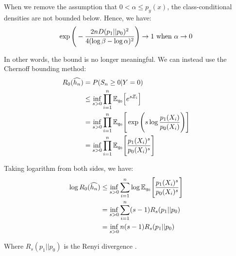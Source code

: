 \begin{solution*}
    When we remove the assumption that $0 < \alpha \le p_y(x)$, the class-conditional densities are not bounded below. Hence, we have:
    \begin{align*}
        \exp\Bigg( 
                -\frac{2nD(p_1||p_0)^2}{4(\log\beta - \log\alpha)^2}
         \Bigg) \to 1 \text{ when } \alpha \to 0
    \end{align*}

    \noindent In other words, the bound is no longer meaningful. We can instead use the Chernoff bounding method:
    \begin{align*}
        R_0(\widehat{h_n}) 
            &= P(S_n \ge 0 | Y = 0) \\
            &\le \inf_{s>0} \prod_{i=1}^n \mathbb{E}_{q_0}\Big[ e^{sZ_i} \Big] \\
            &= \inf_{s>0} \prod_{i=1}^n \mathbb{E}_{q_0}\Bigg[ 
                \exp\Bigg( 
                    s\log\frac{p_1(X_i)}{p_0(X_i)}
                 \Bigg)
             \Bigg] \\
            &= \inf_{s>0} \prod_{i=1}^n \mathbb{E}_{q_0}\Bigg[ 
                \frac{p_1(X_i)^s}{p_0(X_i)^s}
             \Bigg] \\
    \end{align*}

    \noindent Taking logarithm from both sides, we have:
    \begin{align*}
        \log R_0(\widehat{h_n}) 
            &\le \inf_{s>0} \sum_{i=1}^n \log \mathbb{E}_{q_0}\Bigg[ 
                \frac{p_1(X_i)^s}{p_0(X_i)^s}
             \Bigg] \\
            &= \inf_{s>0}  \sum_{i=1}^n (s-1)R_s(p_1 || p_0) \\
            &= \inf_{s>0}  n(s-1)R_s(p_1 || p_0) \\
    \end{align*}

    \noindent Where $R_s(p_1||p_0)$ is the Renyi divergence \cite{wiki:renyi_entropy}.
\end{solution*}